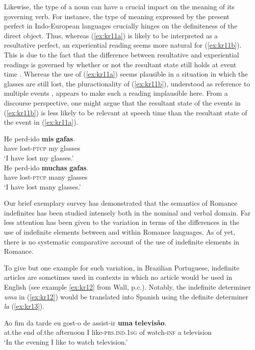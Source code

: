 \documentclass[output=paper,colorlinks,citecolor=brown]{langscibook}
\begin{document}
Likewise, the type of a noun can have a crucial impact on the meaning of its governing verb. For instance, the type of meaning expressed by the present perfect in Indo-European languages crucially hinges on the definiteness of the direct object. Thus, whereas (\ref{ex:kr11a}) is likely to be interpreted as a resultative perfect, an experiential reading seems more natural for (\ref{ex:kr11b}). This is due to the fact that the difference between resultative and experiential readings is governed by whether or not the resultant state still holds at event time \citep[155--156]{IatridouAnagnostopoulou2003}. Whereas the use of (\ref{ex:kr11a}) seems plausible in a situation in which the glasses are still lost, the pluractionality of (\ref{ex:kr11b}), understood as reference to multiple events \citep{VanGeenhoven2004}, appears to make such a reading implausible here. From a discourse perspective, one might argue that the resultant state of the events in (\ref{ex:kr11b}) is less likely to be relevant at speech time than the resultant state of the event in (\ref{ex:kr11a}).

\ea\label{ex:kr11} 
    \ea\label{ex:kr11a} 
\gll He perd-ido \textbf{mis} \textbf{gafas}.\\
     have lost-\textsc{ptcp} my glasses\\
\glt ‘I have lost my glasses.’\\
    \ex\label{ex:kr11b} 
\gll He perd-ido \textbf{muchas} \textbf{gafas}.\\
     have lost-\textsc{ptcp} many glasses\\
\glt ‘I have lost many glasses.’\\
\z
\z

Our brief exemplary survey has demonstrated that the semantics of Romance indefinites has been studied intensely both in the nominal and verbal domain. Far less attention has been given to the variation in terms of the differences in the use of indefinite elements between and within Romance languages. As of yet, there is no systematic comparative account of the use of indefinite elements in Romance.

To give but one example for such variation, in Brazilian Portuguese, indefinite articles are sometimes used in contexts in which no article would be used in English (see example \ref{ex:kr12} from Wall, p.c.). Notably, the indefinite determiner \textit{uma} in (\ref{ex:kr12}) would be translated into Spanish using the definite determiner \textit{la} (\ref{ex:kr13}). 

\ea\label{ex:kr12} 
\gll Ao fim da tarde eu gost-o de assist-ir \textbf{uma} \textbf{televisão}.\\
     at.the end of.the afternoon I like-\textsc{prs.ind.1sg} of watch-\textsc{inf} a television\\
\glt ‘In the evening I like to watch television.'\\
\z
\end{document}
